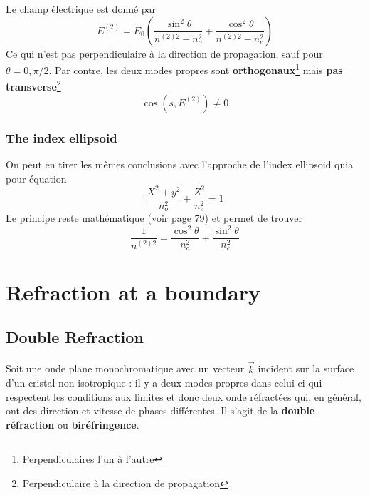 Le champ électrique est donné par
\begin{equation}
E^{(2)} = E_0\left(\dfrac{\sin^2\theta}{n^{(2)2}-n_o^2}+\dfrac{\cos^2\theta}{n^{(2)2}-n_e^2}\right)
\end{equation}
Ce qui n'est pas perpendiculaire à la direction de propagation, sauf pour $\theta = 0, \pi/2$. Par
contre, les deux modes propres sont \textbf{orthogonaux}\footnote{Perpendiculaires l'un à l'autre} mais
\textbf{pas transverse}\footnote{Perpendiculaire à la direction de propagation}
\begin{equation}
\cos(s,E^{(2)}) \neq 0
\end{equation}


\subsubsection{The index ellipsoid}
On peut en tirer les mêmes conclusions avec l'approche de l'index ellipsoid quia pour équation
\begin{equation}
\dfrac{X^2+y^2}{n_o^2}+\dfrac{Z^2}{n_e^2}=1
\end{equation}
Le principe reste mathématique (voir page 79) et permet de trouver
\begin{equation}
\dfrac{1}{n^{(2)2}} = \dfrac{\cos^2\theta}{n_o^2}+\dfrac{\sin^2\theta}{n_e^2}
\end{equation}








\section{Refraction at a boundary}
\subsection{Double Refraction}
Soit une onde plane monochromatique avec un vecteur $\vec{k}$ incident sur la surface d'un 
cristal non-isotropique : il y a deux modes propres dans celui-ci qui respectent les conditions 
aux limites et donc deux onde réfractées qui, en général, ont des direction et vitesse de phases
différentes. Il s'agit de la \textbf{double réfraction} ou \textbf{biréfringence}.\\


